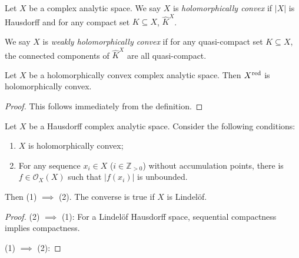 \iffalse
\begin{thm}[Grauert]
    Let $X$ be a holomorphically spreadable complex analytic space. Then there is $n\in \mathbb{N}$ a quasi-finite morphism $f:X\rightarrow \mathbb{C}^n$.
\end{thm}
\begin{proof}
    
\end{proof}
\fi


\begin{definition}
    Let $X$ be a complex analytic space. We say $X$ is \emph{holomorphically convex} if $|X|$ is Hausdorff and for any compact set $K\subseteq X$, $\hat{K}^X$.

    We say $X$ is \emph{weakly holomorphically convex} if for any quasi-compact set $K\subseteq X$, the connected components of $\hat{K}^X$ are all quasi-compact.
\end{definition}

\begin{proposition}
    Let $X$ be a holomorphically convex complex analytic space. Then $X^{\operatorname{red}}$ is holomorphically convex.
\end{proposition}
\begin{proof}
    This follows immediately from the definition.
\end{proof}

\begin{proposition}\label{prop-holoconvchar}
    Let $X$ be a Hausdorff complex analytic space. Consider the following conditions:
    \begin{enumerate}
        \item $X$ is holomorphically convex;
        \item For any sequence $x_i\in X$ ($i\in \mathbb{Z}_{>0}$) without accumulation points, there is $f\in \mathcal{O}_X(X)$ such that $|f(x_i)|$ is unbounded.
    \end{enumerate}
    Then (1) $\implies$ (2). The converse is true if $X$ is Lindelöf.
\end{proposition}
\begin{proof}
    (2) $\implies$ (1): For a Lindelöf Hausdorff space, sequential compactness implies compactness. 

    (1) $\implies$ (2): 
\end{proof}

